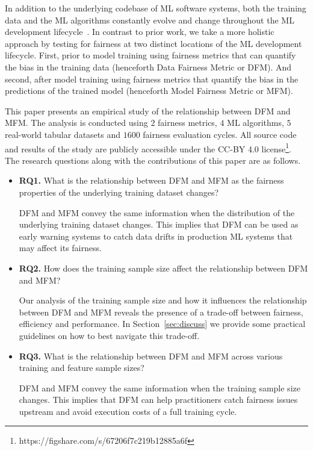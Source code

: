 \documentclass{article}
\begin{document}
In addition to the underlying codebase of ML software systems, both
the training data and the ML algorithms constantly evolve and change
throughout the ML development
lifecycle \cite{sculley2015hidden,bosch2021engineering,hutchinson2021towards}. In
contrast to prior work, we take a more holistic approach by testing
for fairness at two distinct locations of the ML development
lifecycle. First, prior to model training using fairness metrics that
can quantify the bias in the training data (henceforth Data Fairness
Metric or DFM). And second, after model training using fairness
metrics that quantify the bias in the predictions of the trained model
(henceforth Model Fairness Metric or MFM).

This paper presents an empirical study of the relationship between DFM
and MFM. The analysis is conducted using $2$ fairness metrics, $4$ ML
algorithms, $5$ real-world tabular datasets and $1600$ fairness
evaluation cycles. All source code and results of the study are
publicly accessible under the CC-BY 4.0
license\footnote{https://figshare.com/s/67206f7c219b12885a6f}. The
research questions along with the contributions of this paper are as
follows.

\begin{itemize}
  \item{\textbf{RQ1.}} What is the relationship between DFM and MFM as the
    fairness properties of the underlying training dataset changes?

    DFM and MFM convey the same information when the distribution of
    the underlying training dataset changes. This implies that DFM can
    be used as early warning systems to catch data drifts in
    production ML systems that may affect its fairness.

  \item{\textbf{RQ2.}} How does the training sample size affect the
    relationship between DFM and MFM?

    Our analysis of the training sample size and how it influences the
    relationship between DFM and MFM reveals the presence of
    a trade-off between fairness, efficiency and performance. In
    Section \ref{sec:discuss} we provide some practical guidelines on
    how to best navigate this trade-off.

  \item{\textbf{RQ3.}} What is the relationship between DFM and MFM across
    various training and feature sample sizes?

    DFM and MFM convey the same information when the training sample
    size changes. This implies that DFM can help practitioners catch
    fairness issues upstream and avoid execution costs of a full
    training cycle.
\end{itemize}
\end{document}
